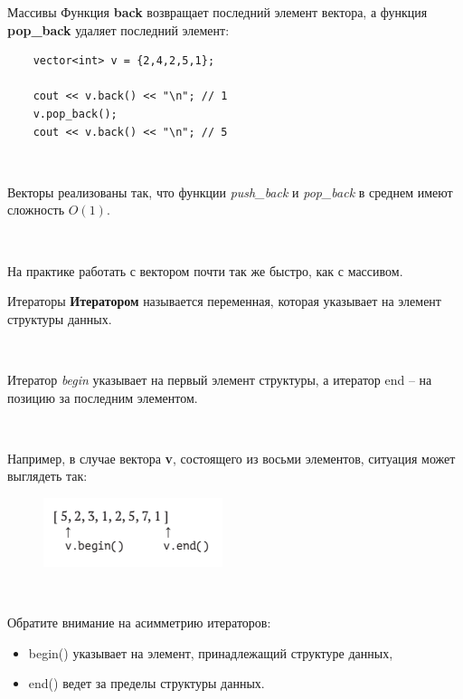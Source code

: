 \documentclass{beamer}
\begin{document}
\begin{frame}[fragile]{Массивы}
    Функция \textbf{back} возвращает последний элемент вектора, а функция \textbf{pop\_back} удаляет последний элемент:
	\begin{verbatim}
    vector<int> v = {2,4,2,5,1};
    
    cout << v.back() << "\n"; // 1
    v.pop_back();
    cout << v.back() << "\n"; // 5
	\end{verbatim}

    ~

    Векторы реализованы так, что функции \textit{push\_back} и \textit{pop\_back} в среднем имеют сложность $O(1)$. 
    
    ~
    
    На практике работать с вектором почти так же быстро, как с массивом.
\end{frame}

\begin{frame}[fragile]{Итераторы}
    \textbf{Итератором} называется переменная, которая указывает на элемент структуры данных. 

    ~

    Итератор \textit{begin} указывает на первый элемент структуры, а итератор end -- на позицию за последним элементом. 

    ~

    Например, в случае вектора \textbf{v}, состоящего из восьми элементов, ситуация может выглядеть так:

	\begin{figure}[h]
		\centering
		\includegraphics[scale=1.0]{images/lec11-pic01.png}
	\end{figure}

    ~
    
    Обратите внимание на асимметрию итераторов: 
	\begin{itemize}
		\item begin() указывает на элемент, принадлежащий структуре данных, 
		\item end() ведет за пределы структуры данных.	
	\end{itemize}
\end{frame}
\end{document}
